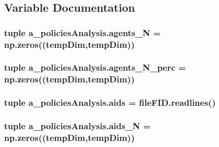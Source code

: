 \subsection{Variable Documentation}
\hypertarget{namespacea__policies_analysis_adec2b86353098e680f65251021bb96e9}{
\subsubsection[{agents\-\_\-\-N}]{\setlength{\rightskip}{0pt plus 5cm}tuple a\-\_\-policies\-Analysis.\-agents\-\_\-\-N = np.\-zeros(({\bf temp\-Dim},{\bf temp\-Dim}))}}\label{namespacea__policies_analysis_adec2b86353098e680f65251021bb96e9}
\hypertarget{namespacea__policies_analysis_a7815063cb21e89278e2073045c265ab1}{
\subsubsection[{agents\-\_\-\-N\-\_\-perc}]{\setlength{\rightskip}{0pt plus 5cm}tuple a\-\_\-policies\-Analysis.\-agents\-\_\-\-N\-\_\-perc = np.\-zeros(({\bf temp\-Dim},{\bf temp\-Dim}))}}\label{namespacea__policies_analysis_a7815063cb21e89278e2073045c265ab1}
\hypertarget{namespacea__policies_analysis_ad17c9d07e6a4475d6ff28ed051ace583}{
\subsubsection[{aids}]{\setlength{\rightskip}{0pt plus 5cm}tuple a\-\_\-policies\-Analysis.\-aids = file\-F\-I\-D.\-readlines()}}\label{namespacea__policies_analysis_ad17c9d07e6a4475d6ff28ed051ace583}
\hypertarget{namespacea__policies_analysis_acea698d5a752396651a6805aa2df3fa7}{
\subsubsection[{aids\-\_\-\-N}]{\setlength{\rightskip}{0pt plus 5cm}tuple a\-\_\-policies\-Analysis.\-aids\-\_\-\-N = np.\-zeros(({\bf temp\-Dim},{\bf temp\-Dim}))}}\label{namespacea__policies_analysis_acea698d5a752396651a6805aa2df3fa7}
